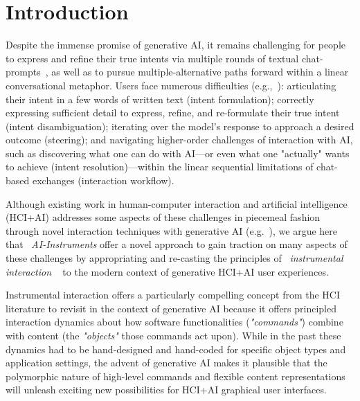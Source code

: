 \section{Introduction}



Despite the immense promise of generative AI, it remains challenging for people to express and refine their true intents via multiple rounds of textual chat-prompts~\cite{mahdavi_goloujeh_is_2024, zamfirescu-pereira_why_2023}, as well as to pursue multiple-alternative paths forward within a linear conversational metaphor. 
Users face numerous difficulties (e.g.,~\cite{subramonyam_bridging_2024}): articulating their intent in a few words of written text (intent formulation); correctly expressing sufficient detail to express, refine, and re-formulate their true intent (intent disambiguation); iterating over the model's response to approach a  desired outcome (steering); and navigating higher-order challenges of interaction with AI, such as discovering what one can do with AI---or even what one "actually" wants to achieve (intent resolution)---within the linear sequential limitations of chat-based exchanges (interaction workflow). 

Although existing work in human-computer interaction and artificial intelligence (HCI+AI) addresses some aspects of these challenges in piecemeal fashion through novel interaction techniques with generative AI (e.g.~\cite{chung_promptpaint_2023, masson_directgpt_2024}), we argue here that ~\textit{AI-Instruments} offer a novel approach to gain traction on many aspects of these challenges by appropriating and re-casting the principles of ~\textit{instrumental interaction} ~\cite{beaudouin2000instrumental, beaudouin2000reification} to the modern context of generative HCI+AI user experiences. 



Instrumental interaction offers a particularly compelling concept from the HCI literature to revisit in the context of generative AI because it offers principled interaction dynamics about how software functionalities (\textit{"commands"}) combine with content (the \textit{"objects"} those commands act upon). While in the past these dynamics had to be hand-designed and hand-coded for specific object types and application settings, the advent of generative AI makes it plausible that the polymorphic nature of high-level commands and flexible content representations will unleash exciting new possibilities for HCI+AI graphical user interfaces. 

